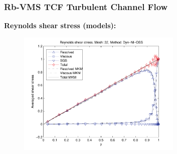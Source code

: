 
\begin{frame}[t]
\frametitle{Rb-VMS TCF {\small Turbulent Channel Flow}}
\textbf{Reynolds shear stress (models):}
  \vspace*{-0.3cm}
  \begin{figure}
    \centering	
    \includegraphics[width=0.7\textwidth]{Figures/Rb_TCF/reystr_395_Dyn_Nl_OSS.pdf}
  \end{figure}
  \vspace*{-0.5cm}
  \begin{overlayarea}{\textwidth}{1.5cm}
  \end{overlayarea}
\end{frame}
